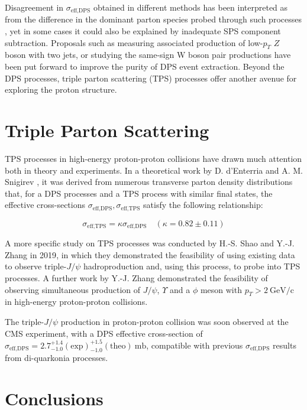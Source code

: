 \documentclass[10pt,twocolumn]{article}
\newcommand*{\effXsecDPS}{\sigma_{\text{eff,DPS}}}
\newcommand*{\effXsecTPS}{\sigma_{\text{eff,TPS}}}
\newcommand*{\GeVc}{~\text{GeV/c}}
\begin{document}
Disagreement in $\effXsecDPS$ obtained in different methods has been interpreted as from the difference in the dominant parton species probed through such processes \cite{MPI_LHC}, yet in some cases it could also be explained by inadequate SPS component subtraction.
Proposals such as measuring associated production of low-$p_T$ $Z$ boson with two jets, or studying the same-sign W boson pair productions have been put forward to improve the purity of DPS event extraction.\cite{andersenExploringHighPurityMultiparton2024}\cite{kuleszaLikesignBosonProduction2000}
Beyond the DPS processes, triple parton scattering (TPS) processes offer another avenue for exploring the proton structure.

\section{Triple Parton Scattering}

TPS processes in high-energy proton-proton collisions have drawn much attention both in theory and experiments.
In a theoretical work by D. d'Enterria and A. M. Snigirev \cite{DdE_TPS}, it was derived from numerous transverse parton density distributions that, for a DPS processes and a TPS process with similar final states, the effective cross-sections $\effXsecDPS, \effXsecTPS$ satisfy the following relationship:

\begin{equation}
    \label{eqn:dps_tps_eff_xsec}
    \effXsecTPS = \kappa \effXsecDPS \quad (\kappa = 0.82 \pm  0.11)
\end{equation}

A more specific study on TPS processes was conducted by H.-S.
Shao and Y.-J. Zhang in 2019\cite{YJZ_TRI_JPSI}, in which they demonstrated the feasibility of using existing data to observe triple-$J/\psi$ hadroproduction and, using this process, to probe into TPS processes.
A further work by Y.-J. Zhang demonstrated the feasibility of observing simultaneous production of $J/\psi$, $\Upsilon$ and a $\phi$ meson with $p_T > 2\GeVc$ in high-energy proton-proton collisions\cite{YJZ_MPS_REPORT}.

The triple-$J/\psi$ production in proton-proton collision was soon observed at the CMS experiment, with a DPS effective cross-section of $\effXsecDPS = 2.7^{+1.4}_{-1.0}(\text{exp})^{+1.5}_{-1.0}(\text{theo}) ~\text{mb}$, compatible with previous $\effXsecDPS$ results from di-quarkonia processes.\cite{CMS_TRI_JPSI}

\section{Conclusions}
\end{document}
